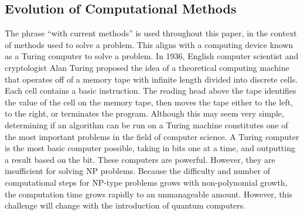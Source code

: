 \documentclass[10pt,journal,compsoc]{IEEEtran}
\begin{document}
\subsection{Evolution of Computational Methods}
 The phrase ``with current methods'' is used throughout this paper, in the context of methods used to solve a problem. This aligns with a computing device known as a Turing computer to solve a problem.  In 1936, English computer scientist and cryptologist Alan Turing proposed the idea of a theoretical computing machine that operates off of a memory tape with infinite length divided into discrete cells. Each cell contains a basic instruction. The reading head above the tape identifies the value of the cell on the memory tape, then moves the tape either to the left, to the right, or terminates the program. Although this may seem very simple, determining if an algorithm can be run on a Turing machine constitutes one of the most important problems in the field of computer science. A Turing computer is the most basic computer possible, taking in bits one at a time, and outputting a result based on the bit.  These computers are powerful. However, they are insufficient for solving NP problems. Because the difficulty and number of computational steps for NP-type problems grows with non-polynomial growth, the computation time grows rapidly to an unmanageable amount. However, this challenge will change with the introduction of quantum computers. 
\end{document}
